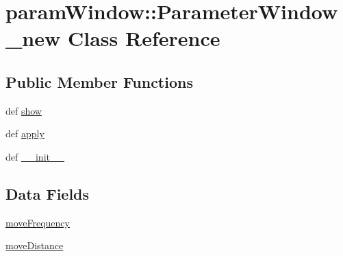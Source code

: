 \hypertarget{classparamWindow_1_1ParameterWindow__new}{
\section{paramWindow::ParameterWindow\_\-new Class Reference}
\label{classparamWindow_1_1ParameterWindow__new}
}
\subsection*{Public Member Functions}
\begin{CompactItemize}
\item 
def \hyperlink{classparamWindow_1_1ParameterWindow__new_9067ebe4b68f0ac638ddd4c9767f6242}{show}
\item 
def \hyperlink{classparamWindow_1_1ParameterWindow__new_2f3ce16aef761a3015ff389a6e322532}{apply}
\item 
def \hyperlink{classparamWindow_1_1ParameterWindow__new_ca6b4e4847134e5bfbcbe3fee763d814}{\_\-\_\-init\_\-\_\-}
\end{CompactItemize}
\subsection*{Data Fields}
\begin{CompactItemize}
\item 
\hyperlink{classparamWindow_1_1ParameterWindow__new_e3d6da4cee37e86d79b4476a8e9183ba}{moveFrequency}
\item 
\hyperlink{classparamWindow_1_1ParameterWindow__new_31661a3c6d182416dfd00a5fbd0bf51a}{moveDistance}
\end{CompactItemize}
